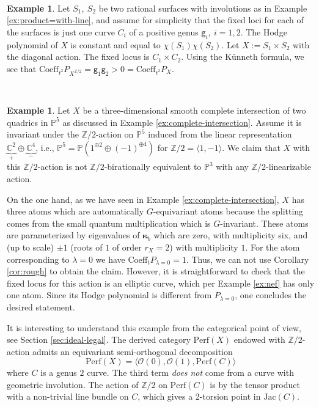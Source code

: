 \documentclass[12pt,a4paper]{amsart}
\theoremstyle{definition}
\newtheorem{example}[theorem]{Example}
\theoremstyle{remark}
\newcommand{\Z}{\mathbb{Z}}
\newcommand{\C}{\mathbb{C}}
\begin{document}
\ 

\begin{example}
Let $S_1,~S_2$ be two rational surfaces with involutions as in Example \ref{ex:product=with-line}, and assume for simplicity that the fixed loci for each of the surfaces is just one curve $C_i$ of a positive genus $\mathsf{g}_i,~i=1,2$. The Hodge polynomial of $X$ is constant and equal to $\chi(S_1)\chi(S_2)$. Let $X:=S_1\times S_2$ with the diagonal action. The fixed locus is $C_1\times C_2$.
Using the K\"unneth formula, we see that $\mathrm{Coeff}_{t^2}P_{X^{\mathbb{Z}/2}}=\mathsf{g}_1\mathsf{g}_2>0=\mathrm{Coeff}_{t^2}P_X$.
\end{example}

\ 
\begin{example}\label{ex:complete-intersection-odd}
  Let $X$ be a three-dimensional smooth complete intersection of two quadrics in $\mathbb{P}^5$ as discussed in Example \ref{ex:complete-intersection}. Assume it is invariant under the $\mathbb Z/2$-action on $\mathbb P^5$ induced from the linear representation $\underbrace{\C^2}_+\oplus \underbrace{\C^4}_{-}$, i.e., $\mathbb P^5=\mathbb P(1^{\oplus 2}\oplus (-1)^{\oplus 4})$ for $\mathbb Z/2=\langle 1,-1\rangle$. We claim that $X$ with this $\mathbb Z/2$-action is not $\mathbb Z/2$-birationally equivalent to $\mathbb P^3$ with any $\mathbb Z/2$-linearizable action.

   On the one hand, as we have seen in Example \ref{ex:complete-intersection}, $X$ has three atoms which are automatically $G$-equivariant atoms because the splitting comes from the small quantum multiplication which is $G$-invariant. These atoms are parameterized by eigenvalues of $\boldsymbol{\kappa}_b$ which are zero, with multiplicity six, and (up to scale) $\pm 1$ (roots of $1$ of order $r_X=2$) with multiplicity $1$. For the atom corresponding to $\lambda=0$ we have $\mathrm{Coeff}_{t}P_{\lambda=0}=1$. Thus, we can not use Corollary \ref{cor:rough} to obtain the claim. However, it is straightforward to check that the fixed locus for this action is an elliptic curve, which per Example \ref{ex:nef} has only one atom. Since its Hodge polynomial is different from $P_{\lambda=0}$, one concludes the desired statement.

   It is interesting to understand this example from the categorical point of view, see Section \ref{sec:ideal-legal}. The derived category $\mathrm{Perf}(X)$ endowed with $\Z/2$-action admits an equivariant semi-orthogonal decomposition
$$\mathrm{Perf}(X)=\langle\mathcal O(0),\mathcal O(1),\mathrm{Perf}(C)\rangle$$
where $C$ is a genus $2$ curve. The third term \textit{does not} come from a curve with geometric involution. The action of $\Z/2$ on $\mathrm{Perf}(C)$ is by the tensor product with a non-trivial line bundle on $C$, which gives a 2-torsion point in $\mathrm{Jac}(C)$.
\end{example}
\end{document}
